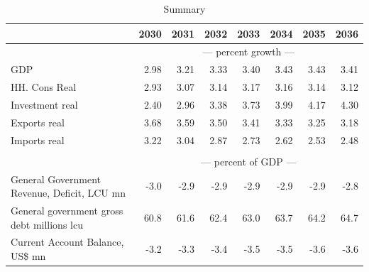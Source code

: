 \documentclass{article}
\begin{document}
 \begin{table}[ht]
\caption{Summary}
\begin{tabular}{lrrrrrrr}
\toprule
 & 2030 & 2031 & 2032 & 2033 & 2034 & 2035 & 2036 \\
\midrule
&\multicolumn{7}{c}{--- percent growth ---}                                                                                                                                             \\
GDP & 2.98 & 3.21 & 3.33 & 3.40 & 3.43 & 3.43 & 3.41 \\
HH. Cons Real & 2.93 & 3.07 & 3.14 & 3.17 & 3.16 & 3.14 & 3.12 \\
Investment real & 2.40 & 2.96 & 3.38 & 3.73 & 3.99 & 4.17 & 4.30 \\
Exports real & 3.68 & 3.59 & 3.50 & 3.41 & 3.33 & 3.25 & 3.18 \\
Imports real & 3.22 & 3.04 & 2.87 & 2.73 & 2.62 & 2.53 & 2.48 \\
&\multicolumn{7}{c}{  }                                                                                                                                             \\
&\multicolumn{7}{c}{--- percent of GDP ---}                                                                                                                                             \\
General Government Revenue, Deficit, LCU mn & -3.0 & -2.9 & -2.9 & -2.9 & -2.9 & -2.9 & -2.8 \\
General government gross debt millions lcu & 60.8 & 61.6 & 62.4 & 63.0 & 63.7 & 64.2 & 64.7 \\
Current Account Balance, US\$ mn & -3.2 & -3.3 & -3.4 & -3.5 & -3.5 & -3.6 & -3.6 \\
\bottomrule
\end{tabular}
\end{table}
\end{document}
